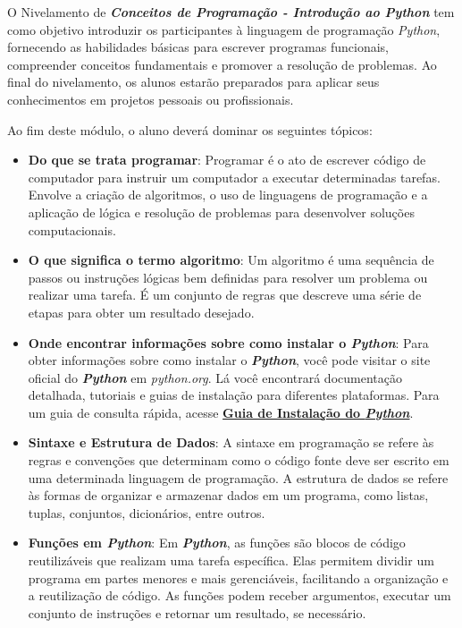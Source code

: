 \documentclass[a4paper, 12pt, onecolumn,singlespacing]{article}
\begin{document}
	O Nivelamento de \textbf{\textit{Conceitos de Programação - Introdução ao Python }}tem como objetivo introduzir os participantes à linguagem de programação \textit{Python}, fornecendo as habilidades básicas para escrever programas funcionais, compreender conceitos fundamentais e promover a resolução de problemas. Ao final do nivelamento, os alunos estarão preparados para aplicar seus conhecimentos em projetos pessoais ou profissionais.
	
	Ao fim deste módulo, o aluno deverá dominar os seguintes tópicos:
	
	\begin{itemize}
		
		\item \textbf{Do que se trata programar}: Programar é o ato de escrever código de computador para instruir um computador a executar determinadas tarefas. Envolve a criação de algoritmos, o uso de linguagens de programação e a aplicação de lógica e resolução de problemas para desenvolver soluções computacionais.
		
		\item \textbf{O que significa o termo algoritmo}: Um algoritmo é uma sequência de passos ou instruções lógicas bem definidas para resolver um problema ou realizar uma tarefa. É um conjunto de regras que descreve uma série de etapas para obter um resultado desejado.
		
		\item \textbf{Onde encontrar informações sobre como instalar o \textit{Python}}: Para obter informações sobre como instalar o \textbf{\textit{Python}}, você pode visitar o site oficial do \textbf{\textit{Python}} em \textit{python.org}. Lá você encontrará documentação detalhada, tutoriais e guias de instalação para diferentes plataformas. Para um guia de consulta rápida, acesse \href{Guia_Instalacao_Python.pdf}{\textbf{Guia de Instalação do \textit{\textbf{Python}}}}.
		
		\item \textbf{Sintaxe e Estrutura de Dados}: A sintaxe em programação se refere às regras e convenções que determinam como o código fonte deve ser escrito em uma determinada linguagem de programação. A estrutura de dados se refere às formas de organizar e armazenar dados em um programa, como listas, tuplas, conjuntos, dicionários, entre outros.
		
		\item \textbf{Funções em \textit{Python}}: Em \textbf{\textit{Python}}, as funções são blocos de código reutilizáveis que realizam uma tarefa específica. Elas permitem dividir um programa em partes menores e mais gerenciáveis, facilitando a organização e a reutilização de código. As funções podem receber argumentos, executar um conjunto de instruções e retornar um resultado, se necessário.
		

\end{itemize}
\end{document}
